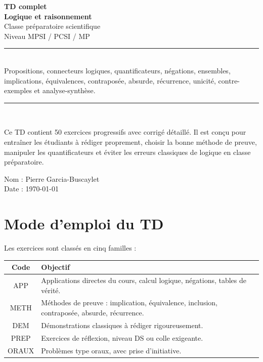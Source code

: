 \documentclass[11pt,a4paper]{article}
\begin{document}
\begin{titlepage}
\centering
\vspace*{1.5cm}

{\Huge\bfseries TD complet}\\[0.3cm]
{\Huge\bfseries Logique et raisonnement}\\[0.5cm]

{\Large Classe préparatoire scientifique}\\[0.2cm]
{\Large Niveau MPSI / PCSI / MP}\\[1cm]

\rule{0.85\textwidth}{0.6pt}\\[0.8cm]

{\large
Propositions, connecteurs logiques, quantificateurs, négations, ensembles, implications, équivalences, contraposée, absurde, récurrence, unicité, contre-exemples et analyse-synthèse.
}\\[0.8cm]

\rule{0.85\textwidth}{0.6pt}\\[1.2cm]

\begin{objectifbox}
Ce TD contient 50 exercices progressifs avec corrigé détaillé. Il est conçu pour entraîner les étudiants à rédiger proprement, choisir la bonne méthode de preuve, manipuler les quantificateurs et éviter les erreurs classiques de logique en classe préparatoire.
\end{objectifbox}

\vfill

{\large Nom : Pierre Garcia-Buscaylet}\\[0.2cm]
{\large Date : \today}

\end{titlepage}

\tableofcontents
\newpage

\section*{Mode d'emploi du TD}

Les exercices sont classés en cinq familles :

\begin{center}
\begin{tabularx}{0.95\textwidth}{|c|X|}
\hline
\textbf{Code} & \textbf{Objectif}\\
\hline
APP & Applications directes du cours, calcul logique, négations, tables de vérité.\\
\hline
METH & Méthodes de preuve : implication, équivalence, inclusion, contraposée, absurde, récurrence.\\
\hline
DEM & Démonstrations classiques à rédiger rigoureusement.\\
\hline
PREP & Exercices de réflexion, niveau DS ou colle exigeante.\\
\hline
ORAUX & Problèmes type oraux, avec prise d'initiative.\\
\hline
\end{tabularx}
\end{center}
\end{document}
